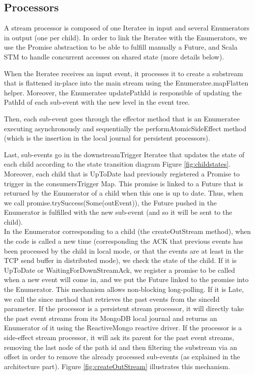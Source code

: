 \subsection{Processors}

A stream processor is composed of one Iteratee in input and several Enumerators in output (one per child). 
In order to link the Iteratee with the Enumerators, we use the Promise abstraction to be able to fulfill manually a Future, and Scala STM  to handle concurrent accesses on shared state (more details below). 

When the Iteratee receives an input event, it processes it to create a substream that is flattened in-place into the main stream using the Enumeratee.mapFlatten helper. Moreover, the Enumeratee updatePathId is responsible of updating the PathId of each sub-event with the new level in the event tree.

Then, each sub-event goes through the effector method that is an Enumeratee executing asynchronously and sequentially the performAtomicSideEffect method (which is the insertion
in the local journal for persistent processors).

Last, sub-events go in the downstreamTrigger Iteratee that updates the state of each child according to the state transition diagram Figure \ref{fig:childstates}. Moreover, each
child that is UpToDate had previously registered a Promise to trigger in the consumersTrigger Map. This promise is linked to a Future that is returned by the Enumerator of a child
when this one is up to date. Thus, when we call promise.trySuccess(Some(outEvent)), the Future pushed in the Enumerator is fulfilled with the new sub-event (and so it will be sent
to the child).
\\

In the Enumerator corresponding to a child (the createOutStream method), when the code is called a new time (corresponding the ACK that previous events has been processed by the child in local mode,
or that the events are at least in the TCP send buffer in distributed mode), we check the state of the child. If it is UpToDate or WaitingForDownStreamAck, we register
a promise to be called when a new event will come in, and we put the Future linked to the promise into the Enumerator. This mechanism allows non-blocking long-polling.
If it is Late, we call the since method that retrieves the past events from the sinceId parameter. If the processor is a persistent stream processor,
it will directly take the past event streams from its MongoDB local journal and returns an Enumerator of it using the ReactiveMongo reactive driver. If the processor is
a side-effect stream processor, it will ask its parent for the past event streams, removing the last node of the path id and then filtering the substream via an offset in order to remove the already processed sub-events (as explained in the architecture part). 
Figure \ref{fig:createOutStream} illustrates this mechanism. 

